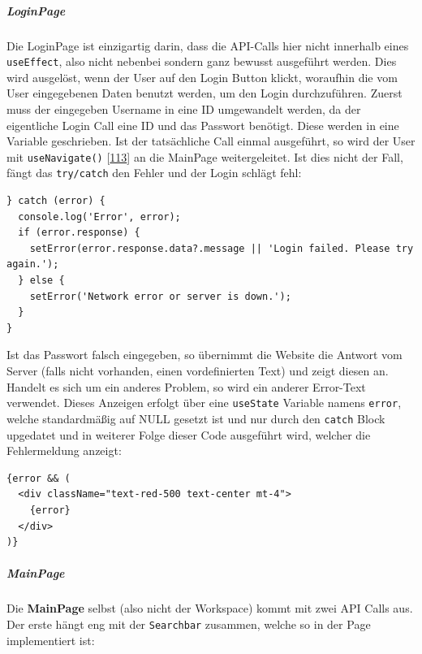 \documentclass[
    headings=optiontotocandhead,%
    twoside,
    numbers=noenddot,%
    12pt, %
    titlepage, %
    parskip=full, %
    listof=leveldown, 
    numbers=noenddot, %
    a4paper,DIV=14,
    BCOR=15mm,
]{scrbook}
\newcommand{\passthrough}[1]{#1}
\begin{document}
\hypertarget{loginpage}{%
\subparagraph{LoginPage}\label{loginpage}}

Die LoginPage ist einzigartig darin, dass die API-Calls hier nicht
innerhalb eines \passthrough{\lstinline!useEffect!}, also nicht nebenbei
sondern ganz bewusst ausgeführt werden. Dies wird ausgelöst, wenn der
User auf den Login Button klickt, woraufhin die vom User eingegebenen
Daten benutzt werden, um den Login durchzuführen. Zuerst muss der
eingegeben Username in eine ID umgewandelt werden, da der eigentliche
Login Call eine ID und das Passwort benötigt. Diese werden in eine
Variable geschrieben. Ist der tatsächliche Call einmal ausgeführt, so
wird der User mit \passthrough{\lstinline!useNavigate()!}
{[}\protect\hyperlink{ref-GeeksForGeeks-useNavigate}{113}{]} an die
MainPage weitergeleitet. Ist dies nicht der Fall, fängt das
\passthrough{\lstinline!try/catch!} den Fehler und der Login schlägt
fehl:

\begin{lstlisting}[caption={Error-Handling in der LoginPage}]
} catch (error) {
  console.log('Error', error);
  if (error.response) {
    setError(error.response.data?.message || 'Login failed. Please try again.');
  } else {
    setError('Network error or server is down.');
  }
}
\end{lstlisting}

Ist das Passwort falsch eingegeben, so übernimmt die Website die Antwort
vom Server (falls nicht vorhanden, einen vordefinierten Text) und zeigt
diesen an. Handelt es sich um ein anderes Problem, so wird ein anderer
Error-Text verwendet. Dieses Anzeigen erfolgt über eine
\passthrough{\lstinline!useState!} Variable namens
\passthrough{\lstinline!error!}, welche standardmäßig auf NULL gesetzt
ist und nur durch den \passthrough{\lstinline!catch!} Block upgedatet
und in weiterer Folge dieser Code ausgeführt wird, welcher die
Fehlermeldung anzeigt:

\begin{lstlisting}[caption={Aufscheinen des Error Textes basierend auf boolean Variable error}]
{error && (
  <div className="text-red-500 text-center mt-4">
    {error}
  </div>
)}
\end{lstlisting}

\hypertarget{mainpage}{%
\subparagraph{MainPage}\label{mainpage}}

Die \textbf{MainPage} selbst (also nicht der Workspace) kommt mit zwei
API Calls aus. Der erste hängt eng mit der
\passthrough{\lstinline!Searchbar!} zusammen, welche so in der Page
implementiert ist:
\end{document}

